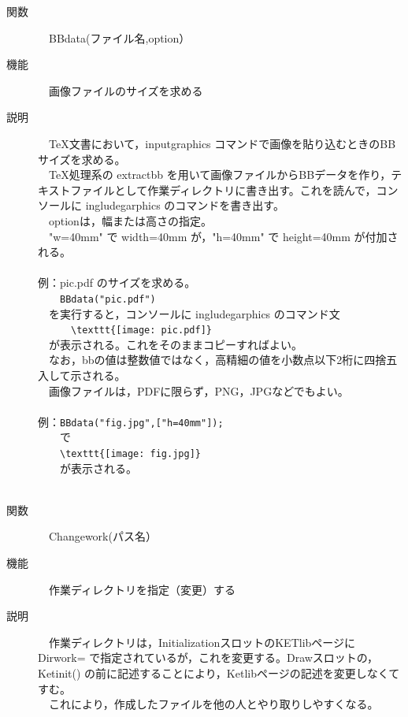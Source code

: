 \documentclass[papersize,a4paper,12pt,uplatex]{jsarticle}
\begin{document}
\begin{description}
\hypertarget{bbdata}{}
\item[関数]　BBdata(ファイル名,option）
\item[機能]　画像ファイルのサイズを求める
\item[説明]　TeX文書において，inputgraphics コマンドで画像を貼り込むときのBBサイズを求める。\\
　TeX処理系の extractbb を用いて画像ファイルからBBデータを作り，テキストファイルとして作業ディレクトリに書き出す。これを読んで，コンソールに ingludegarphics のコマンドを書き出す。\\ 
　optionは，幅または高さの指定。\\
　"w=40mm" で  width=40mm が，"h=40mm"  で height=40mm が付加される。\\
　\\
例：pic.pdf のサイズを求める。\\
　　\verb|BBdata("pic.pdf")|\\
　を実行すると，コンソールに ingludegarphics のコマンド文\\
　　　\verb|\texttt{[image: pic.pdf]} |\\
　が表示される。これをそのままコピーすればよい。\\
　なお，bbの値は整数値ではなく，高精細の値を小数点以下2桁に四捨五入して示される。\\
　画像ファイルは，PDFに限らず，PNG，JPGなどでもよい。\\
　\\
例：\verb|BBdata("fig.jpg",["h=40mm"]);|\\
　　で\\
　　\verb|\texttt{[image: fig.jpg]} |\\
　　が表示される。\\
　\\

\hypertarget{changework}{}
\item[関数]　Changework(パス名）
\item[機能]　作業ディレクトリを指定（変更）する
\item[説明]　作業ディレクトリは，InitializationスロットのKETlibページに Dirwork= で指定されているが，これを変更する。Drawスロットの，Ketinit() の前に記述することにより，Ketlibページの記述を変更しなくてすむ。\\
　これにより，作成したファイルを他の人とやり取りしやすくなる。\\


\end{description}
\end{document}
